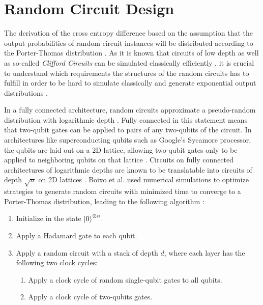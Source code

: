 \section{Random Circuit Design}

The derivation of the cross entropy difference based on the assumption that the
output probabilities of random circuit instances will be distributed according to
the Porter-Thomas distribution \cite{Boixo2018supremacy}. As it is known that circuits of low depth as
well as so-called \textit{Clifford Circuits} can be simulated classically
efficiently \cite{gottesman1998heisenberg}, it is crucial to understand which requirements the structures of
the random circuits has to fulfill in order to be hard to simulate classically and generate
exponential output distributions \cite{Boixo2018supremacy}.

In a fully connected architecture, random circuits approximate a pseudo-random
distribution with logarithmic depth \cite{harrow2008random}. Fully connected in this statement means
that two-qubit gates can be applied to pairs of any two-qubits of the circuit. In
architectures like superconducting qubits such as Google's Sycamore
processor, the qubits are laid out on a 2D lattice, allowing two-qubit gates only
to be applied to neighboring qubits on that lattice \cite{barends2014logic}. Circuits on fully
connected architectures of logarithmic depths are known to be translatable into
circuits of depth $\sqrt{n}$ on 2D lattices \cite{beals2013efficient}. Boixo et al. used numerical
simulations to optimize strategies to generate random circuits with minimized
time to converge to a Porter-Thomas distribution, leading to the following algorithm \cite{Boixo2018supremacy}:

\begin{enumerate}
  \item Initialize in the state $\Ket{0}^{\otimes n}$.
  \item Apply a Hadamard gate to each qubit.
  \item Apply a random circuit with a stack of depth $d$, where each layer has
    the following two clock cycles:
    \begin{enumerate}
      \item Apply a clock cycle of random single-qubit gates to all qubits.
        \item Apply a clock cycle of two-qubits gates.
    \end{enumerate}
\end{enumerate}

